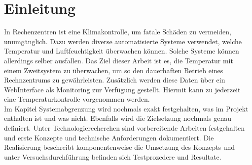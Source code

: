 \section{Einleitung}
In Rechenzentren ist eine Klimakontrolle, um fatale Schäden zu vermeiden, unumgänglich. Dazu werden diverse automatisierte Systeme verwendet, welche Temperatur und Luftfeuchtigkeit überwachen können. Solche Systeme können allerdings selber ausfallen. Das Ziel dieser Arbeit ist es, die Temperatur mit einem Zweitsystem zu überwachen, um so den dauerhaften Betrieb eines Rechnzentrums zu gewährleisten. Zusätzlich werden diese Daten über ein WebInterface als Monitoring zur Verfügung gestellt. Hiermit kann zu jederzeit eine Temperaturkontrolle vorgenommen werden.\\
Im Kapitel Systemabgrenzung wird nochmals exakt festgehalten, was im Projekt enthalten ist und was nicht. Ebenfalls wird die Zielsetzung nochmals genau definiert. Unter Technologierecherchen sind vorbereitende Arbeiten festgehalten und erste Konzepte und technische Anforderungen dokumentiert. Die Realisierung beschreibt komponentenweise die Umsetzung des Konzepts und unter Versuchsdurchführung befinden sich Testprozedere und Resultate.
\newpage